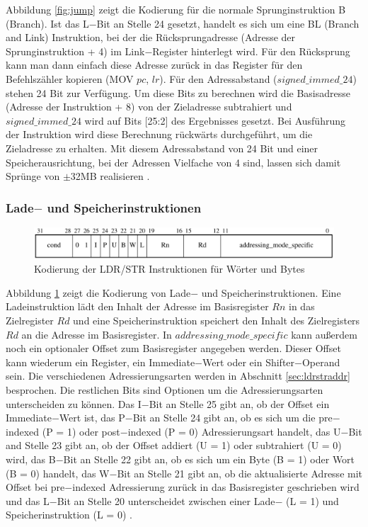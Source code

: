 \documentclass[a4paper, 11pt, onecolumn]{article}
\begin{document}
Abbildung \ref{fig:jump} zeigt die Kodierung für die normale Sprunginstruktion B (Branch). Ist das L$-$Bit an Stelle 24 gesetzt, handelt es sich um eine BL (Branch and Link) Instruktion, bei der die Rücksprungadresse (Adresse der Sprunginstruktion + 4) im Link$-$Register hinterlegt wird. Für den Rücksprung kann man dann einfach diese Adresse zurück in das Register für den Befehlszähler kopieren (MOV $pc$, $lr$). Für den Adressabstand ($signed\_immed\_24$) stehen 24 Bit zur Verfügung. Um diese Bits zu berechnen wird die Basisadresse (Adresse der Instruktion + 8) von der Zieladresse subtrahiert und $signed\_immed\_24$ wird auf Bits $[$25:2$]$ des Ergebnisses gesetzt. Bei Ausführung der Instruktion wird diese Berechnung rückwärts durchgeführt, um die Zieladresse zu erhalten. Mit diesem Adressabstand von 24 Bit und einer Speicherausrichtung, bei der Adressen Vielfache von 4 sind, lassen sich damit Sprünge von $\pm$32MB realisieren \cite{arm:2005}.

\subsubsection{Lade$-$ und Speicherinstruktionen}

\begin{figure}[!htb]
\centering
\includegraphics[width=1\textwidth]{data/ldrstr}
\caption[Kodierung LDR/STR]{Kodierung der LDR/STR Instruktionen für Wörter und Bytes \cite{arm:2005}}
\label{fig:ldrstr}
\end{figure}

Abbildung \ref{fig:ldrstr} zeigt die Kodierung von Lade$-$ und Speicherinstruktionen. Eine Ladeinstruktion lädt den Inhalt der Adresse im Basisregister $Rn$ in das Zielregister $Rd$ und eine Speicherinstruktion speichert den Inhalt des Zielregisters $Rd$ an die Adresse im Basisregister. In $addressing\_mode\_specific$ kann außerdem noch ein optionaler Offset zum Basisregister angegeben werden. Dieser Offset kann wiederum ein Register, ein Immediate$-$Wert oder ein Shifter$-$Operand sein. Die verschiedenen Adressierungsarten werden in Abschnitt \ref{sec:ldrstraddr} besprochen. Die restlichen Bits sind Optionen um die Adressierungsarten unterscheiden zu können. Das I$-$Bit an Stelle 25 gibt an, ob der Offset ein Immediate$-$Wert ist, das P$-$Bit an Stelle 24 gibt an, ob es sich um die pre$-$indexed (P = 1) oder post$-$indexed (P = 0) Adressierungsart handelt, das U$-$Bit and Stelle 23 gibt an, ob der Offset addiert (U = 1) oder subtrahiert (U = 0) wird, das B$-$Bit an Stelle 22 gibt an, ob es sich um ein Byte (B = 1) oder Wort (B = 0) handelt, das W$-$Bit an Stelle 21 gibt an, ob die aktualisierte Adresse mit Offset bei pre$-$indexed Adressierung zurück in das Basisregister geschrieben wird und das L$-$Bit an Stelle 20 unterscheidet zwischen einer Lade$-$ (L = 1) und Speicherinstruktion (L = 0) \cite{arm:2005}.
\end{document}
